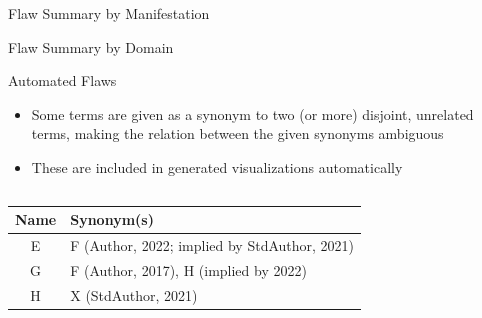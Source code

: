 \documentclass{beamer}
\begin{document}
\begin{frame}{Flaw Summary by Manifestation}
    \begin{center}
        
    \end{center}
\end{frame}

\begin{frame}{Flaw Summary by Domain}
    \begin{center}
        
    \end{center}
\end{frame}

\begin{frame}{Automated Flaws}
    \begin{itemize}
        \item Some terms are given as a synonym to two (or more) disjoint,
              unrelated terms, making the relation between the given synonyms
              ambiguous \pause
        \item These are included in generated visualizations automatically
    \end{itemize}
    \vspace{-0.5cm}
    \begin{columns}[c]
        \begin{column}{.475\linewidth}
            \small
            \begin{table}[hbtp!]
                \centering
                \begin{tabularx}{\textwidth}{c>{\raggedleft\arraybackslash}X} \hline
                    Name & Synonym(s)                                   \\ \hline
                    E    & F (Author, 2022; implied by StdAuthor, 2021) \\
                    G    & F (Author, 2017), H (implied by 2022)        \\
                    H    & X (StdAuthor, 2021)                          \\ \hline
                \end{tabularx}
            \end{table}
        \end{column}
        \begin{column}{.5\linewidth}

\end{column}
\end{columns}
\end{frame}
\end{document}
